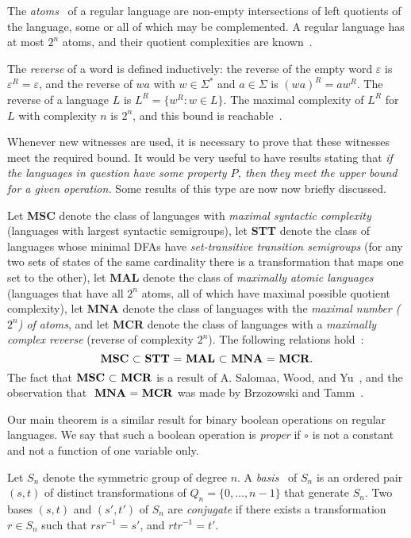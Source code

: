 \documentclass{llncs}
\newcommand{\eps}{\varepsilon}
\newcommand{\Sig}{\Sigma}
\begin{document}
The \emph{atoms}~\cite{BrTa11,BrTa12} of a regular language are non-empty intersections of left quotients of the language, some or all of which may be complemented. A regular language has at most $2^n$ atoms, and their quotient complexities are known~\cite{BrTa12}.

The \emph{reverse} of a word is defined inductively: the reverse of the empty word $\eps$ is $\eps^R=\eps$, and the reverse of $wa$ with $w\in\Sig^*$ and $a\in \Sig$ is $(wa)^R=aw^R$.
The reverse of a language $L$ is $L^R=\{w^R\colon w\in L\}$.
The maximal complexity of $L^R$ for $L$ with  complexity $n$ is $2^n$, and this bound is reachable~\cite{Mir66}.
\medskip

Whenever new witnesses are used, it is necessary to prove that these witnesses  meet the required bound. It would be very useful to have results stating that \emph{if the languages in question have some  property $P$, then they meet the upper bound for a given operation.} 
Some results of this type are now now briefly discussed. 


Let \textbf{MSC} denote the class of languages with \emph{maximal syntactic complexity} (languages with largest syntactic semigroups), let \textbf{STT} denote the class of languages whose minimal DFAs have \emph{set-transitive transition semigroups} (for any two sets of states of the same cardinality there is a transformation that maps one set to the other), let \textbf{MAL} denote the class of \emph{maximally atomic languages} (languages that have all $2^n$ atoms, all of which have maximal possible quotient complexity), let \textbf{MNA} denote the class of languages with the \emph{maximal number {\rm ($2^n$) of atoms}}, and let \textbf{MCR} denote the class of languages with a \emph{maximally complex reverse} (reverse of complexity $2^n$). The following relations hold~\cite{BrDa13a}:
\[ \text{\textbf{MSC} $\subset$ \textbf{STT} = \textbf{MAL} $\subset$ \textbf{MNA} = \textbf{MCR}.} \]
The fact that $\text{\textbf{MSC} $\subset$  \textbf{MCR}} $
is a result of  A. Salomaa, Wood, and Yu~\cite{SWY04},
and the observation that $ \text{ \textbf{MNA} = \textbf{MCR}}$ was made by Brzozowski and Tamm~\cite{BrTa11}.


 Our main theorem is a similar result for binary boolean operations on regular languages. We say that such a boolean operation is \emph{proper} if $\circ$ is not a constant  and not a function of one variable only. 

Let $S_n$ denote the symmetric group of degree $n$. 
A \emph{basis}~\cite{Pic39} of $S_n$
is an ordered pair $(s,t)$ of distinct transformations of $Q_n=\{0,\dots,n-1\}$ that generate $S_n$.
Two bases $(s,t)$ and $(s',t')$ of $S_n$ are \emph{conjugate} if there exists a transformation $r\in S_n$ such that $rsr^{-1}=s'$, and  $rtr^{-1}=t'$.
\end{document}
